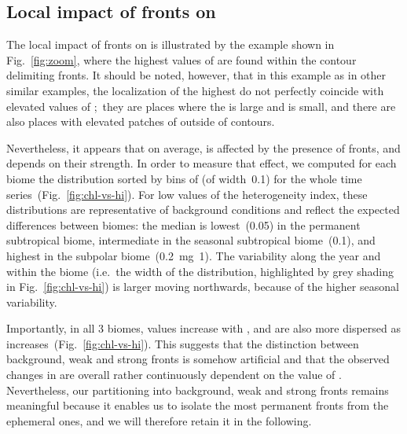 \subsection{Local impact of fronts on }

The local impact of fronts on  is illustrated by the example shown in Fig.~\ref{fig:zoom}, where the highest values of  are found within the  contour delimiting fronts.
It should be noted, however, that in this example as in other similar examples, the localization of the highest  do not perfectly coincide with elevated values of ;\ they are places where the  is large and  is small, and there are also places with elevated patches of  outside of  contours.

Nevertheless, it appears that on average,  is affected by the presence of fronts, and depends on their strength.
In order to measure that effect, we computed for each biome the  distribution sorted by bins of  (of width~\num{0.1}) for the whole time series~(Fig.~\ref{fig:chl-vs-hi}).
For low values of the heterogeneity index, these distributions are representative of background conditions and reflect the expected differences between biomes: the median  is lowest~(\qty{0.05}{\mgm}) in the permanent subtropical biome, intermediate in the seasonal subtropical biome~(\qty{0.1}{\mgm}), and highest in the subpolar biome~(\qty{0.2}{\mg1}).
The  variability along the year and within the biome (i.e.\ the width of the distribution, highlighted by grey shading in Fig.~\ref{fig:chl-vs-hi}) is larger moving northwards, because of the higher seasonal variability.

Importantly, in all 3 biomes,  values increase with , and are also more dispersed as  increases~(Fig.~\ref{fig:chl-vs-hi}).
This suggests that the distinction between background, weak and strong fronts is somehow artificial and that the observed changes in  are overall rather continuously dependent on the value of .
Nevertheless, our partitioning into background, weak and strong fronts remains meaningful because it enables us to isolate the most permanent fronts from the ephemeral ones, and we will therefore retain it in the following.


